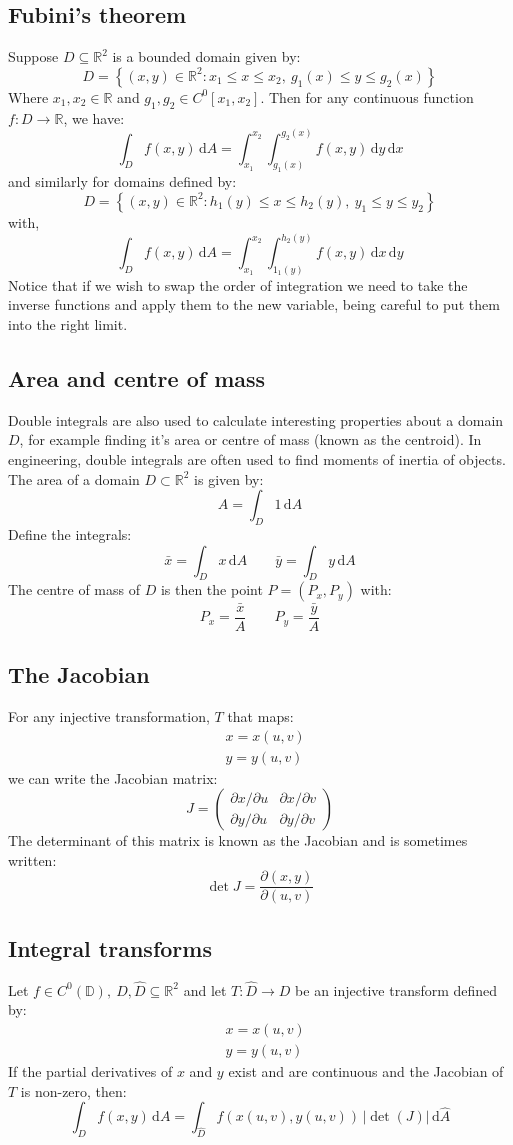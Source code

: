 \documentclass[12pt]{article}
\begin{document}
\subsection*{Fubini's theorem}
Suppose \(D\subseteq \mathbb{R}^2\) is a bounded domain given by:
\[D=\left\{(x,y)\in\mathbb{R}^2: x_1\leq x\leq x_2,\ g_1(x)\leq y\leq g_2(x)\right\}\]
Where \(x_1,x_2\in\mathbb{R}\) and \(g_1,g_2\in C^0[x_1,x_2]\). Then for any continuous function \(f:D\to\mathbb{R}\), we have:
\[\int_Df(x,y)\,\text{d}A=\int^{x_2}_{x_1}\int^{g_2(x)}_{g_1(x)}f(x,y)\,\text{d}y\,\text{d}x\]
and similarly for domains defined by:
\[D=\left\{(x,y)\in \mathbb{R}^2:h_1(y)\leq x\leq h_2(y),\ y_1\leq y\leq y_2\right\}\]
with,
\[\int_Df(x,y)\,\text{d}A=\int^{x_2}_{x_1}\int^{h_2(y)}_{1_1(y)}f(x,y)\,\text{d}x\,\text{d}y\]
Notice that if we wish to swap the order of integration we need to take the inverse functions and apply them to the new variable, being careful to put them into the right limit.
\subsection*{Area and centre of mass}
Double integrals are also used to calculate interesting properties about a domain \(D\), for example finding it's area or centre of mass (known as the centroid). In engineering, double integrals are often used to find moments of inertia of objects. The area of a domain \(D\subset\mathbb{R}^2\) is given by:
\[A=\int_D1\,\text{d}A\]
Define the integrals:
\[\bar{x}=\int_Dx\,\text{d}A\qquad\bar{y}=\int_Dy\,\text{d}A\]
The centre of mass of \(D\) is then the point \(P=(P_x,P_y)\) with:
\[P_x=\frac{\bar{x}}{A}\qquad P_y=\frac{\bar{y}}{A}\]
\subsection*{The Jacobian}
For any injective transformation, \(T\) that maps:
\begin{align*}
    &x=x(u,v) \\
    &y=y(u,v)
\end{align*}
we can write the Jacobian matrix:
\[J=\begin{pmatrix}
    \partial x/\partial u & \partial x/\partial v \\
    \partial y/ \partial u & \partial y/\partial v
\end{pmatrix}\]
The determinant of this matrix is known as the Jacobian and is sometimes written:
\[\det J=\frac{\partial (x,y)}{\partial (u,v)}\]
\subsection*{Integral transforms}
Let \(f\in C^0(\mathbb{D}),\ D,\hat{D}\subseteq\mathbb{R}^2\) and let \(T:\hat{D}\to D\) be an injective transform defined by:
\begin{align*}
    &x=x(u,v) \\
    &y=y(u,v)
\end{align*}
If the partial derivatives of \(x\) and \(y\) exist and are continuous and the Jacobian of \(T\) is non-zero, then:
\[\int_Df(x,y)\,\text{d}A=\int_{\hat{D}}f(x(u,v),y(u,v))\,|\det(J)|\,\text{d}\hat{A}\]
\end{document}
